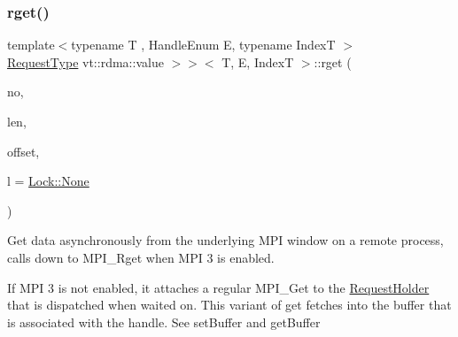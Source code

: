 \subsubsection{\texorpdfstring{rget()}{rget()}\hspace{0.1cm}{\footnotesize\ttfamily [1/2]}}
{\footnotesize\ttfamily template$<$typename T , Handle\+Enum E, typename IndexT $>$ \\
\hyperlink{structvt_1_1rdma_1_1_handle_3_01_t_00_01_e_00_01_index_t_00_01typename_01std_1_1enable__if__t_3_d15dac1b5db6e2bc0fb0b8aca42b1456_a94cb0db8d9b038fb504cb01b1d1d37a9}{Request\+Type} vt\+::rdma\+::value $>$$>$$<$ T, E, IndexT $>$\+::rget (\begin{DoxyParamCaption}\item[{\hyperlink{namespacevt_a866da9d0efc19c0a1ce79e9e492f47e2}{vt\+::\+Node\+Type}}]{no,  }\item[{std\+::size\+\_\+t}]{len,  }\item[{int}]{offset,  }\item[{\hyperlink{namespacevt_1_1rdma_ac5c20b41a653e520b6305d4d454ecb70}{Lock}}]{l = {\ttfamily \hyperlink{namespacevt_1_1rdma_ac5c20b41a653e520b6305d4d454ecb70a6adf97f83acf6453d4a6a4b1070f3754}{Lock\+::\+None}} }\end{DoxyParamCaption})}



Get data asynchronously from the underlying M\+PI window on a remote process, calls down to {\ttfamily M\+P\+I\+\_\+\+Rget} when M\+PI 3 is enabled. 

If M\+PI 3 is not enabled, it attaches a regular {\ttfamily M\+P\+I\+\_\+\+Get} to the {\ttfamily \hyperlink{structvt_1_1rdma_1_1_request_holder}{Request\+Holder}} that is dispatched when waited on. This variant of {\ttfamily get} fetches into the buffer that is associated with the handle. See {\ttfamily set\+Buffer} and {\ttfamily get\+Buffer} 


